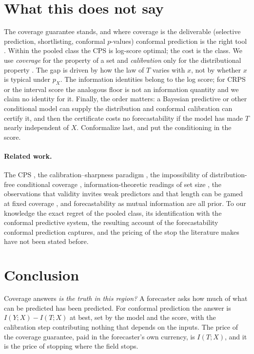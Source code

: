 \documentclass[11pt]{article}
\theoremstyle{definition}
\begin{document}
\section{What this does not say}\label{sec:scope}

The coverage guarantee stands, and where coverage is the deliverable (selective prediction,
shortlisting, conformal $p$-values) conformal prediction is the right tool
\citep{angelopoulos2021uncertainty,bates2021distribution}. Within the pooled class the CPS is
log-score optimal; the cost is the class. We use \emph{coverage} for the property of a set
and \emph{calibration} only for the distributional property \citep{gneiting2007probabilistic}.
The gap is driven by how the law of $T$ varies with $x$, not by whether $x$ is typical under
$p_X$. The information identities belong to the log score; for CRPS or the interval score the
analogous floor is not an information quantity and we claim no identity for it. Finally, the
order matters: a Bayesian predictive or other conditional model can supply the distribution
and conformal calibration can certify it, and then the certificate costs no forecastability
if the model has made $T$ nearly independent of $X$. Conformalize last, and put the
conditioning in the score.

\paragraph{Related work.} The CPS \citep{vovk2019nonparametric}, the calibration--sharpness
paradigm \citep{gneiting2007probabilistic}, the impossibility of distribution-free conditional
coverage \citep{lei2014distribution,barber2021limits}, information-theoretic readings of set
size \citep{correia2024information}, the observations that validity invites weak predictors
\citep{recht2024cover} and that length can be gamed at fixed coverage
\citep{min2026coveragelength}, and forecastability as mutual information
\citep{delsole2004,catt2026} are all prior. To our knowledge the exact regret of the pooled
class, its identification with the conformal predictive system, the resulting account of the
forecastability conformal prediction captures, and the pricing of the stop the literature
makes have not been stated before.

\section{Conclusion}

Coverage answers \emph{is the truth in this region?} A forecaster asks how much of what can be
predicted has been predicted. For conformal prediction the answer is $I(Y;X)-I(T;X)$ at best,
set by the model and the score, with the calibration step contributing nothing that depends on
the inputs. The price of the coverage guarantee, paid in the forecaster's own currency, is
$I(T;X)$, and it is the price of stopping where the field stops.
\end{document}
